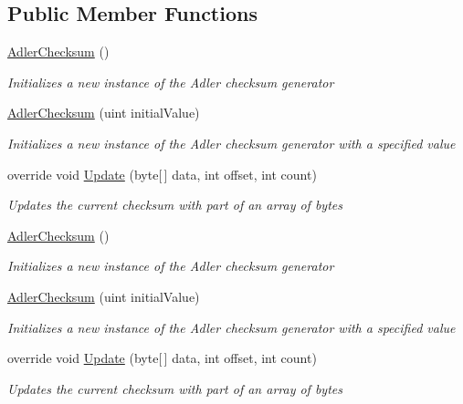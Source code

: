 \subsection*{Public Member Functions}
\begin{DoxyCompactItemize}
\item 
\hyperlink{class_dot_z_lib_1_1_adler_checksum_a8b968384065103a827ac7bfb7bfab66d}{Adler\+Checksum} ()
\begin{DoxyCompactList}\small\item\em Initializes a new instance of the Adler checksum generator \end{DoxyCompactList}\item 
\hyperlink{class_dot_z_lib_1_1_adler_checksum_ab983bcafef50a5f578398d2aa83d7433}{Adler\+Checksum} (uint initial\+Value)
\begin{DoxyCompactList}\small\item\em Initializes a new instance of the Adler checksum generator with a specified value \end{DoxyCompactList}\item 
override void \hyperlink{class_dot_z_lib_1_1_adler_checksum_a757dd32613c477dcb7384b206b72fc34}{Update} (byte\mbox{[}$\,$\mbox{]} data, int offset, int count)
\begin{DoxyCompactList}\small\item\em Updates the current checksum with part of an array of bytes \end{DoxyCompactList}\item 
\hyperlink{class_dot_z_lib_1_1_adler_checksum_a8b968384065103a827ac7bfb7bfab66d}{Adler\+Checksum} ()
\begin{DoxyCompactList}\small\item\em Initializes a new instance of the Adler checksum generator \end{DoxyCompactList}\item 
\hyperlink{class_dot_z_lib_1_1_adler_checksum_ab983bcafef50a5f578398d2aa83d7433}{Adler\+Checksum} (uint initial\+Value)
\begin{DoxyCompactList}\small\item\em Initializes a new instance of the Adler checksum generator with a specified value \end{DoxyCompactList}\item 
override void \hyperlink{class_dot_z_lib_1_1_adler_checksum_a757dd32613c477dcb7384b206b72fc34}{Update} (byte\mbox{[}$\,$\mbox{]} data, int offset, int count)
\begin{DoxyCompactList}\small\item\em Updates the current checksum with part of an array of bytes \end{DoxyCompactList}\end{DoxyCompactItemize}
